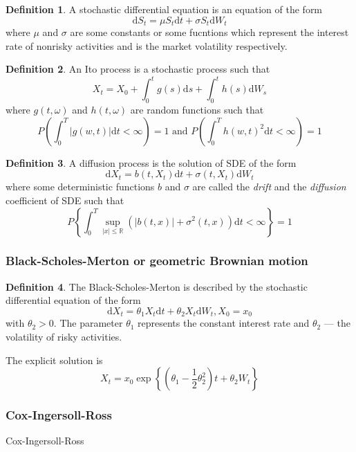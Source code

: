 \documentclass{article}
\theoremstyle{definition}
\newtheorem{definition}{Definition}[section]
\begin{document}
\begin{definition}
    A stochastic differential equation is an equation of the form
    $$\mathrm d S_t = \mu S_t \mathrm dt + \sigma S_t \mathrm d W_t$$
    where $\mu$ and $\sigma$ are some constants or some fucntions which represent the interest rate of nonrisky activities and is the market volatility respectively.
\end{definition}

\begin{definition}
    An Ito process is a stochastic process such that
    $$X_t = X_0 + \int_0^t g(s) \mathrm ds + \int_0^t h(s) \mathrm dW_s$$
    where $g(t, \omega)$ and $h(t, \omega)$ are random functions such that
    $$P \left( \int_0^T |g(w, t)| \mathrm dt  < \infty\right) = 1 \text{ and } P \left( \int_0^T h(w, t)^2 \mathrm dt  < \infty\right) = 1$$
\end{definition}

\begin{definition}
    A diffusion process is the solution of SDE of the form
    $$\mathrm d X_t = b(t, X_t) \mathrm  d t + \sigma(t, X_t) \mathrm d W_t$$
    where some deterministic functions $b$ and $\sigma$ are called the \emph{drift} and the \emph{diffusion} coefficient of SDE such that
    $$P\left\{\int_0^T \sup_{|x|\leq \mathbb R}(|b(t, x)| + \sigma^2(t, x))\mathrm dt < \infty\right\} = 1$$
\end{definition}

\subsubsection{Black-Scholes-Merton or geometric Brownian motion}

\begin{definition}
    The  Black-Scholes-Merton is described by the stochastic differential equation of the form
    $$\mathrm d X_t = \theta_1 X_t \mathrm d t + \theta_2 X_t \mathrm d W_t, X_0=x_0$$
    with $\theta_2 > 0$. The parameter $\theta_1$ represents the constant interest rate and $\theta_2$ --- the volatility of risky activities.
\end{definition}

The explicit solution is $$X_t = x_0 \exp\left\{ \left(\theta_1 - \frac{1}{2}\theta_2^2 \right) t + \theta_2 W_t \right\}$$

\subsubsection{Cox-Ingersoll-Ross}
Cox-Ingersoll-Ross
\end{document}
